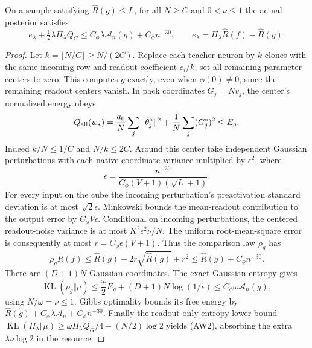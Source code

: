 \begin{lemma}
\label{lem:all-width-clone}
On a sample satisfying $\widehat R(g)\le L$, for all $N\ge C$ and
$0<\nu\le1$ the actual posterior satisfies
\[
 e_\lambda+\tfrac12\lambda\Pi_\lambda Q_G
 \le C_\phi\lambda\mathcal A_n(g)+C_\phi n^{-30},
 \qquad
 e_\lambda=\Pi_\lambda\widehat R(f)-\widehat R(g).       \tag{AW2}
\]
\end{lemma}
\begin{proof}
Let $k=\lfloor N/C\rfloor\ge N/(2C)$. Replace each teacher neuron by
$k$ clones with the same incoming row and readout coefficient $c_i/k$;
set all remaining parameter centers to zero. This computes $g$ exactly,
even when $\phi(0)\ne0$, since the remaining readout centers vanish.
In pack coordinates $G_j=Nv_j$, the center's normalized energy obeys
\[
 Q_{\rm all}(w_*)=\frac{a_0}N\sum_j\|\theta_j^*\|^2
                         +\frac1N\sum_j(G_j^*)^2
 \le E_g.
\]
Indeed $k/N\le1/C$ and $N/k\le2C$.
Around this center take independent Gaussian perturbations with each
native coordinate variance multiplied by $\epsilon^2$, where
\[
 \epsilon=\frac{n^{-30}}{C_\phi(V+1)(\sqrt L+1)}.
\]
For every input on the cube the incoming perturbation's preactivation
standard deviation is at most $\sqrt2\epsilon$. Minkowski bounds the
mean-readout contribution to the output error by
$C_\phi V\epsilon$. Conditional on incoming perturbations, the centered
readout-noise variance is at most $K^2\epsilon^2\nu/N$.
The uniform root-mean-square error is consequently at most
$r=C_\phi\epsilon(V+1)$. Thus the comparison law $\rho_g$ has
\[
 \rho_g\widehat R(f)
 \le\widehat R(g)+2r\sqrt{\widehat R(g)}+r^2
 \le\widehat R(g)+C_\phi n^{-30}.
\]
There are $(D+1)N$ Gaussian coordinates. The exact Gaussian entropy gives
\[
 \operatorname{KL}(\rho_g\Vert\mu)
 \le\frac\omega2E_g+(D+1)N\log(1/\epsilon)
 \le C_\phi\omega\mathcal A_n(g),
\]
using $N/\omega=\nu\le1$.
Gibbs optimality bounds its free energy by
$\widehat R(g)+C_\phi\lambda\mathcal A_n+C_\phi n^{-30}$.
Finally the readout-only entropy lower bound
$\operatorname{KL}(\Pi_\lambda\Vert\mu)
\ge\omega\Pi_\lambda Q_G/4-(N/2)\log2$
yields (AW2), absorbing the extra $\lambda\nu\log2$ in the resource.
\end{proof}

